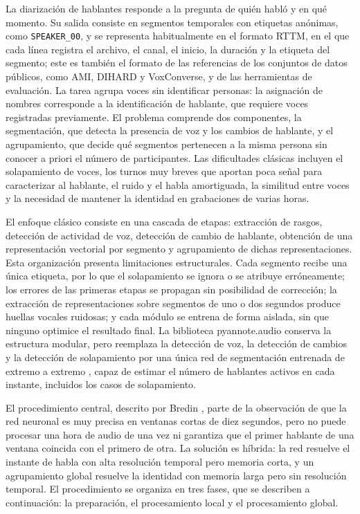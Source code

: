 \documentclass[11pt,a4paper]{article}
\begin{document}
La diarización de hablantes responde a la pregunta de quién habló y en qué momento. Su salida consiste en segmentos temporales con etiquetas anónimas, como \texttt{SPEAKER\_00}, y se representa habitualmente en el formato RTTM, en el que cada línea registra el archivo, el canal, el inicio, la duración y la etiqueta del segmento; este es también el formato de las referencias de los conjuntos de datos públicos, como AMI, DIHARD y VoxConverse, y de las herramientas de evaluación. La tarea agrupa voces sin identificar personas: la asignación de nombres corresponde a la identificación de hablante, que requiere voces registradas previamente. El problema comprende dos componentes, la segmentación, que detecta la presencia de voz y los cambios de hablante, y el agrupamiento, que decide qué segmentos pertenecen a la misma persona sin conocer a priori el número de participantes. Las dificultades clásicas incluyen el solapamiento de voces, los turnos muy breves que aportan poca señal para caracterizar al hablante, el ruido y el habla amortiguada, la similitud entre voces y la necesidad de mantener la identidad en grabaciones de varias horas.

El enfoque clásico consiste en una cascada de etapas: extracción de rasgos, detección de actividad de voz, detección de cambio de hablante, obtención de una representación vectorial por segmento y agrupamiento de dichas representaciones. Esta organización presenta limitaciones estructurales. Cada segmento recibe una única etiqueta, por lo que el solapamiento se ignora o se atribuye erróneamente; los errores de las primeras etapas se propagan sin posibilidad de corrección; la extracción de representaciones sobre segmentos de uno o dos segundos produce huellas vocales ruidosas; y cada módulo se entrena de forma aislada, sin que ninguno optimice el resultado final. La biblioteca pyannote.audio \cite{bredin2020} conserva la estructura modular, pero reemplaza la detección de voz, la detección de cambios y la detección de solapamiento por una única red de segmentación entrenada de extremo a extremo \cite{bredin2021}, capaz de estimar el número de hablantes activos en cada instante, incluidos los casos de solapamiento.

El procedimiento central, descrito por Bredin \cite{bredin2023}, parte de la observación de que la red neuronal es muy precisa en ventanas cortas de diez segundos, pero no puede procesar una hora de audio de una vez ni garantiza que el primer hablante de una ventana coincida con el primero de otra. La solución es híbrida: la red resuelve el instante de habla con alta resolución temporal pero memoria corta, y un agrupamiento global resuelve la identidad con memoria larga pero sin resolución temporal. El procedimiento se organiza en tres fases, que se describen a continuación: la preparación, el procesamiento local y el procesamiento global.
\end{document}
